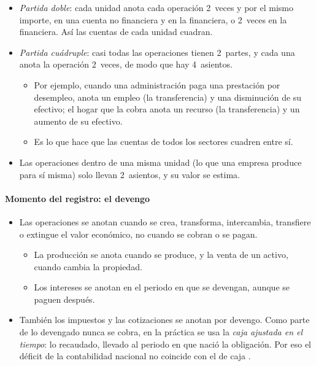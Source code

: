 \documentclass[11pt]{article}
\begin{document}
\begin{itemize}
\item \emph{Partida doble}: cada unidad anota cada operación 2~veces y por el mismo importe, en una cuenta no financiera y en la financiera, o 2~veces en la financiera. Así las cuentas de cada unidad cuadran.
\item \emph{Partida cuádruple}: casi todas las operaciones tienen 2~partes, y cada una anota la operación 2~veces, de modo que hay 4~asientos.
  \begin{itemize}
  \item Por ejemplo, cuando una administración paga una prestación por desempleo, anota un empleo (la transferencia) y una disminución de su efectivo; el hogar que la cobra anota un recurso (la transferencia) y un aumento de su efectivo\nocite{SEC2010}.
  \item Es lo que hace que las cuentas de todos los sectores cuadren entre sí.
  \end{itemize}
\item Las operaciones dentro de una misma unidad (lo que una empresa produce para sí misma) solo llevan 2~asientos, y su valor se estima.
\end{itemize}

\paragraph{Momento del registro: el devengo}

\begin{itemize}
\item Las operaciones se anotan cuando se crea, transforma, intercambia, transfiere o extingue el valor económico, no cuando se cobran o se pagan.
  \begin{itemize}
  \item La producción se anota cuando se produce, y la venta de un activo, cuando cambia la propiedad.
  \item Los intereses se anotan en el periodo en que se devengan, aunque se paguen después.
  \end{itemize}
\item También los impuestos y las cotizaciones se anotan por devengo. Como parte de lo devengado nunca se cobra, en la práctica se usa la \emph{caja ajustada en el tiempo}: lo recaudado, llevado al periodo en que nació la obligación\nocite{SEC2010}. Por eso el déficit de la contabilidad nacional no coincide con el de caja .
\end{itemize}
\end{document}
